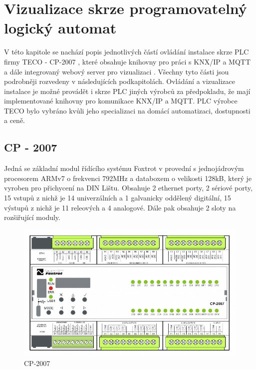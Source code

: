 \chapter{Vizualizace skrze programovatelný logický automat}
V této kapitole se nachází popis jednotlivých částí ovládání instalace skrze PLC firmy TECO - CP-2007 \cite{TECO}, které obsahuje knihovny pro práci s KNX/IP \cite{KNXlib} a MQTT \cite{MQTTlib} a dále integrovaný webový server pro vizualizaci \cite{WebMaker}. Všechny tyto části jsou podrobněji rozvedeny v následujících podkapitolách.
Ovládání a vizualizace instalace je možné provádět i skrze PLC jiných výrobců za předpokladu, že mají implementované knihovny pro komunikace KNX/IP a MQTT. PLC výrobce TECO bylo vybráno kvůli jeho specializaci na domácí automatizaci, dostupnosti a ceně.
\section{CP - 2007}
Jedná se základní modul řídícího systému Foxtrot v provední s jednojádrovým procesorem ARMv7 o frekvenci 792MHz a databoxem o velikosti 128kB, který je vyroben pro přichycení na DIN Lištu. Obsahuje 2 ethernet porty, 2 sériové porty, 15 vstupů z nichž je 14 univerzálních a 1 galvanicky oddělený digitální, 15 výstupů z nichž je 11 releových a 4 analogové. Dále pak obsahuje 2 sloty na rozšiřující moduly. \cite{TECO}

\begin{figure}[!ht]
    \begin{center}
        \includegraphics[scale=0.7]{obrazky/CP-2007.png}
    \end{center}
    \caption[CP-2007 \cite{TECO}]{CP-2007 \cite{TECO}}
    \label{fig:CP-2007}
\end{figure}

